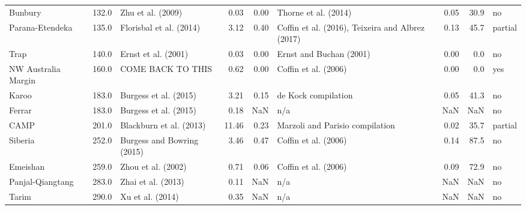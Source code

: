 \begin{tabular}{lrlrrlrrl}
             Bunbury &  132.0 &            Zhu et al. (2009) &                0.03 &               0.00 &                              Thorne et al. (2014) &              0.05 &       30.9 &       no \\
     Parana-Etendeka &  135.0 &      Florisbal et al. (2014) &                3.12 &               0.40 &  Coffin et al. (2016), Teixeira and Albrez (2017) &              0.13 &       45.7 &  partial \\
                Trap &  140.0 &          Ernst et al. (2001) &                0.03 &               0.00 &                           Ernst and Buchan (2001) &              0.00 &        0.0 &       no \\
 NW Australia Margin &  160.0 &            COME BACK TO THIS &                0.62 &               0.00 &                              Coffin et al. (2006) &              0.00 &        0.0 &      yes \\
               Karoo &  183.0 &        Burgess et al. (2015) &                3.21 &               0.15 &                               de Kock compilation &              0.05 &       41.3 &       no \\
              Ferrar &  183.0 &        Burgess et al. (2015) &                0.18 &                NaN &                                               n/a &               NaN &        NaN &       no \\
                CAMP &  201.0 &      Blackburn et al. (2013) &               11.46 &               0.23 &                   Marzoli and Parisio compilation &              0.02 &       35.7 &  partial \\
             Siberia &  252.0 &   Burgess and Bowring (2015) &                3.46 &               0.47 &                              Coffin et al. (2006) &              0.14 &       87.5 &       no \\
            Emeishan &  259.0 &           Zhou et al. (2002) &                0.71 &               0.06 &                              Coffin et al. (2006) &              0.09 &       72.9 &       no \\
    Panjal-Qiangtang &  283.0 &           Zhai et al. (2013) &                0.11 &                NaN &                                               n/a &               NaN &        NaN &       no \\
               Tarim &  290.0 &             Xu et al. (2014) &                0.35 &                NaN &                                               n/a &               NaN &        NaN &       no \\

\end{tabular}
